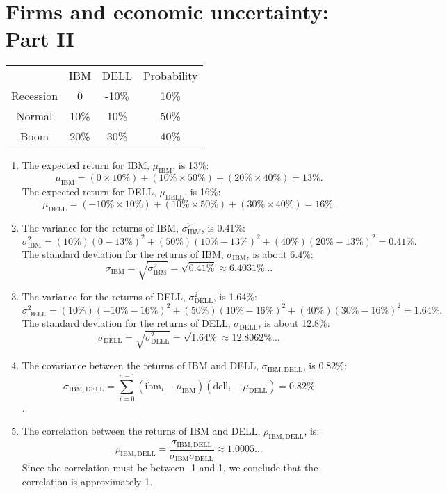 \documentclass[12pt]{article}
\begin{document}
\section{Firms and economic uncertainty: Part II}
\begin{center}\begin{tabular}{c||c|c|c}
&IBM&DELL&Probability\\
Recession&0&-10\%&10\%\\
Normal&10\%&10\%&50\%\\
Boom&20\%&30\%&40\%
\end{tabular}\end{center}
\begin{enumerate}
    \item The expected return for IBM, $\mu_{\mathrm{IBM}}$, is 13\%:
    \[\mu_{\mathrm{IBM}}=(0\times 10\%)+(10\%\times 50\%)+(20\%\times 40\%)=13\%.\]
    The expected return for DELL, $\mu_{\mathrm{DELL}}$, is 16\%:
    \[\mu_{\mathrm{DELL}}=(-10\%\times 10\%)+(10\%\times 50\%)+(30\%\times 40\%)=16\%.\]
    \item The variance for the returns of IBM, $\sigma^2_{\mathrm{IBM}}$, is 0.41\%:
    \[\sigma^2_{\mathrm{IBM}}=(10\%)(0-13\%)^2+(50\%)(10\%-13\%)^2+(40\%)(20\%-13\%)^2=0.41\%.\]
    The standard deviation for the returns of IBM, $\sigma_{\mathrm{IBM}}$, is about 6.4\%:
    \[\sigma_{\mathrm{IBM}}=\sqrt{\sigma^2_{\mathrm{IBM}}}=\sqrt{0.41\%}\approx 6.4031\%\dots\]
    \item The variance for the returns of DELL, $\sigma^2_{\mathrm{DELL}}$, is 1.64\%:
    \[\sigma^2_{\mathrm{DELL}}=(10\%)(-10\%-16\%)^2+(50\%)(10\%-16\%)^2+(40\%)(30\%-16\%)^2=1.64\%.\]
    The standard deviation for the returns of DELL, $\sigma_{\mathrm{DELL}}$, is about 12.8\%:
    \[\sigma_{\mathrm{DELL}}=\sqrt{\sigma^2_{\mathrm{DELL}}}=\sqrt{1.64\%}\approx 12.8062\%\dots\]
    \item The covariance between the returns of IBM and DELL, $\sigma_{\mathrm{IBM},\mathrm{DELL}}$, is 0.82\%:
    \[\sigma_{\mathrm{IBM},\mathrm{DELL}}=\sum_{i=0}^{n-1}(\mathrm{ibm}_i-\mu_{\mathrm{IBM}})(\mathrm{dell}_i-\mu_{\mathrm{DELL}})=0.82\%\].
    \item The correlation between the returns of IBM and DELL, $\rho_{\mathrm{IBM},\mathrm{DELL}}$, is:
    \[\rho_{\mathrm{IBM},\mathrm{DELL}}=\frac{\sigma_{\mathrm{IBM},\mathrm{DELL}}}{\sigma_{\mathrm{IBM}}\sigma_{\mathrm{DELL}}}\approx 1.0005\dots\]
    Since the correlation must be between -1 and 1, we conclude that the correlation is approximately 1.
\end{enumerate}
\end{document}
